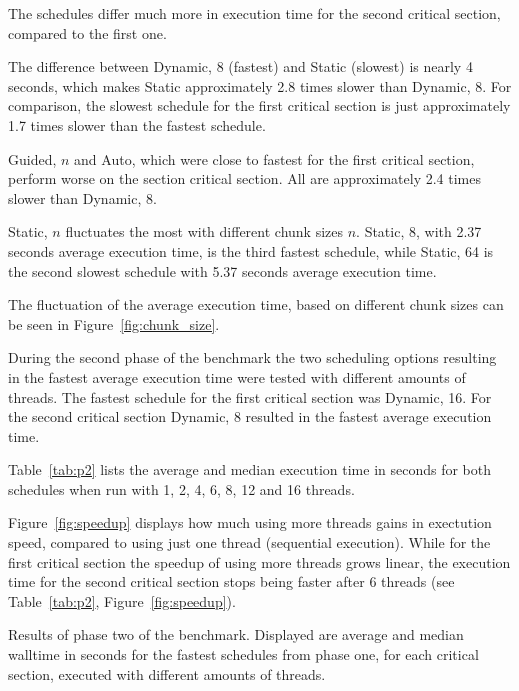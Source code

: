 \documentclass[twoside,11pt]{article}
\begin{document}
The schedules differ much more in execution time for
the second critical section, compared to the first one.

The difference between Dynamic, 8 (fastest) and Static
(slowest) is nearly 4 seconds, which makes Static
approximately 2.8 times slower than Dynamic, 8.
For comparison, the slowest schedule for
the first critical section is just approximately 1.7 times
slower than the fastest schedule.

Guided, $n$ and Auto, which were close to fastest for
the first critical section, perform worse on the
section critical section. All are approximately 2.4 times
slower than Dynamic, 8.

Static, $n$ fluctuates the most with different chunk
sizes $n$.
Static, 8, with 2.37 seconds average execution time, is
the third fastest schedule, while Static, 64
is the second slowest schedule with 5.37 seconds
average execution time.

The fluctuation of the average execution time, based
on different chunk sizes can be seen in
Figure~\ref{fig:chunk_size}.

During the second phase of the benchmark the two scheduling
options resulting in the fastest average execution time
were tested with different amounts of threads.
The fastest schedule for the first critical
section was Dynamic, 16. For the second critical section
Dynamic, 8 resulted in the fastest average execution time.

Table~\ref{tab:p2} lists the average and median execution
time in seconds for both schedules when run
with 1, 2, 4, 6, 8, 12 and 16 threads.

Figure~\ref{fig:speedup} displays how much using more
threads gains in exectution speed, compared to using just
one thread (sequential execution).
While for the first critical section the speedup of using
more threads grows linear, the execution time for the
second critical section stops being faster after 6
threads (see Table~\ref{tab:p2}, Figure~\ref{fig:speedup}).

\begin{table}
\begin{center}

\caption{Results of phase two of the benchmark. Displayed
  are average and median walltime in seconds for the
  fastest schedules from phase one, for each
  critical section, executed with different amounts of
  threads.}
\label{tab:p2}
\end{center}
\end{table}
\end{document}
